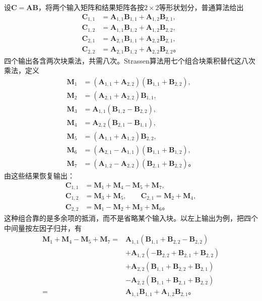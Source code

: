 设$\bm C=\bm A\bm B$，将两个输入矩阵和结果矩阵各按$2\times2$等形状划分，普通算法给出
\begin{equation}
  \begin{aligned}
    \bm C_{1,1}&=\bm A_{1,1}\bm B_{1,1}+\bm A_{1,2}\bm B_{2,1},\\
    \bm C_{1,2}&=\bm A_{1,1}\bm B_{1,2}+\bm A_{1,2}\bm B_{2,2},\\
    \bm C_{2,1}&=\bm A_{2,1}\bm B_{1,1}+\bm A_{2,2}\bm B_{2,1},\\
    \bm C_{2,2}&=\bm A_{2,1}\bm B_{1,2}+\bm A_{2,2}\bm B_{2,2}\text{。}
  \end{aligned}
  \label{eq:cnn-classical-block-product}
\end{equation}
四个输出各含两次块乘法，共需八次。Strassen算法用七个组合块乘积替代这八次乘法，定义
\begin{equation}
  \begin{aligned}
    \bm M_1&=(\bm A_{1,1}+\bm A_{2,2})(\bm B_{1,1}+\bm B_{2,2}),\\
    \bm M_2&=(\bm A_{2,1}+\bm A_{2,2})\bm B_{1,1},\\
    \bm M_3&=\bm A_{1,1}(\bm B_{1,2}-\bm B_{2,2}),\\
    \bm M_4&=\bm A_{2,2}(\bm B_{2,1}-\bm B_{1,1}),\\
    \bm M_5&=(\bm A_{1,1}+\bm A_{1,2})\bm B_{2,2},\\
    \bm M_6&=(\bm A_{2,1}-\bm A_{1,1})(\bm B_{1,1}+\bm B_{1,2}),\\
    \bm M_7&=(\bm A_{1,2}-\bm A_{2,2})(\bm B_{2,1}+\bm B_{2,2})\text{。}
  \end{aligned}
  \label{eq:cnn-strassen-products}
\end{equation}
由这些结果恢复输出：
\begin{equation}
  \begin{aligned}
    \bm C_{1,1}&=\bm M_1+\bm M_4-\bm M_5+\bm M_7,\\
    \bm C_{1,2}&=\bm M_3+\bm M_5,\qquad
    \bm C_{2,1}=\bm M_2+\bm M_4,\\
    \bm C_{2,2}&=\bm M_1-\bm M_2+\bm M_3+\bm M_6\text{。}
  \end{aligned}
  \label{eq:cnn-strassen-recovery}
\end{equation}
这种组合靠的是多余项的抵消，而不是省略某个输入块。以左上输出为例，把四个中间量按左因子归并，有
\begin{equation}
  \begin{aligned}
    \bm M_1+\bm M_4-\bm M_5+\bm M_7
    ={}&\bm A_{1,1}(\bm B_{1,1}+\bm B_{2,2}-\bm B_{2,2})\\
       &+\bm A_{1,2}(-\bm B_{2,2}+\bm B_{2,1}+\bm B_{2,2})\\
       &+\bm A_{2,2}(\bm B_{1,1}+\bm B_{2,2}+\bm B_{2,1})\\
       &-\bm A_{2,2}(\bm B_{1,1}+\bm B_{2,1}+\bm B_{2,2})\\
    ={}&\bm A_{1,1}\bm B_{1,1}+\bm A_{1,2}\bm B_{2,1}\text{。}
  \end{aligned}
  \label{eq:cnn-strassen-cancellation}
\end{equation}
